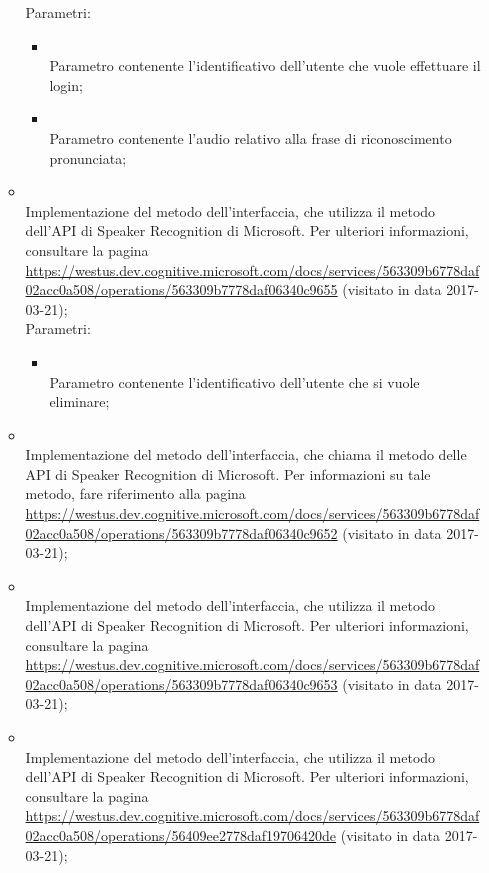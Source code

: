 \begin{itemize}
\begin{itemize}
		Parametri:
		\begin{itemize}
			\item {} \\
			Parametro contenente l'identificativo dell'utente che vuole effettuare il login;
			\item {} \\
			Parametro contenente l'audio relativo alla frase di riconoscimento pronunciata;
		\end{itemize}
		\item[]  \\		Implementazione del metodo dell'interfaccia, che utilizza il metodo  dell'API di Speaker Recognition di Microsoft. Per ulteriori informazioni, consultare la pagina \url{https://westus.dev.cognitive.microsoft.com/docs/services/563309b6778daf02acc0a508/operations/563309b7778daf06340c9655}  (visitato in data 2017-03-21);\\
		Parametri:
		\begin{itemize}
			\item {} \\
			Parametro contenente l'identificativo dell'utente che si vuole eliminare;
		\end{itemize}
		\item[]  \\		Implementazione del metodo dell'interfaccia, che chiama il metodo  delle API di Speaker Recognition di Microsoft. Per informazioni su tale metodo, fare riferimento alla pagina \url{https://westus.dev.cognitive.microsoft.com/docs/services/563309b6778daf02acc0a508/operations/563309b7778daf06340c9652}  (visitato in data 2017-03-21);\\
		\item[]  \\		Implementazione del metodo dell'interfaccia, che utilizza il metodo  dell'API di Speaker Recognition di Microsoft. Per ulteriori informazioni, consultare la pagina \url{https://westus.dev.cognitive.microsoft.com/docs/services/563309b6778daf02acc0a508/operations/563309b7778daf06340c9653}  (visitato in data 2017-03-21);\\
		\item[]  \\		Implementazione del metodo dell'interfaccia, che utilizza il metodo  dell'API di Speaker Recognition di Microsoft. Per ulteriori informazioni, consultare la pagina \url{https://westus.dev.cognitive.microsoft.com/docs/services/563309b6778daf02acc0a508/operations/56409ee2778daf19706420de}  (visitato in data 2017-03-21);\\

\end{itemize}
\end{itemize}
